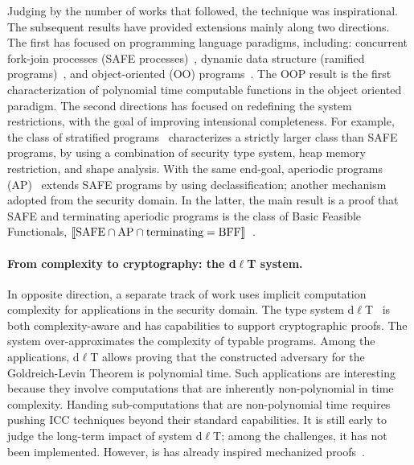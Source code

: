 Judging by the number of works that followed, the technique was inspirational.
The subsequent results have provided extensions mainly along two directions.
The first has focused on programming language paradigms, including: 
concurrent fork-join processes (SAFE processes)~\cite{hainry2013},
dynamic data structure (ramified programs)~\cite{leivant2013}, and
{object-oriented (OO) programs}~\cite{hainry2015}.
The OOP result is the first characterization of polynomial time computable functions in the object oriented paradigm.
The second directions has focused on redefining the system restrictions, with the goal of improving intensional completeness.
For example, the class of stratified programs~\cite{hainry2023} characterizes a strictly larger class than SAFE programs,
by using a combination of {security type system}, heap memory restriction, and shape analysis.
With the same end-goal, aperiodic programs (AP)~\cite{hainry2024} extends SAFE programs by using declassification;
another mechanism adopted from the security domain.
In the latter, the main result is a proof that SAFE and terminating aperiodic programs is the class of Basic Feasible Functionals, \ie \(\llbracket\text{SAFE} \cap \text{AP} \cap \text{terminating} = \text{BFF}\rrbracket\)~\cite{hainry2020,hainry2024}.

\paragraph*{From complexity to cryptography: the d\(\ell\)T system.}
In opposite direction, a separate track of work uses implicit computation complexity for applications in the security domain.
The type system d\(\ell\)T~\cite{baillot2015,baillot2019} is both complexity-aware and has capabilities to support cryptographic proofs.
The system over-approximates the complexity of typable programs.
Among the applications, d\(\ell\)T allows proving that the constructed adversary for 
the Goldreich-Levin Theorem is polynomial time.
Such applications are interesting because they involve computations that are inherently non-polynomial in time complexity.
Handing sub-computations that are non-polynomial time requires pushing ICC techniques beyond their standard capabilities.
It is still early to judge the long-term impact of system d\(\ell\)T\@;
among the challenges, it has not been implemented.
However, is has already inspired mechanized proofs~\cite{barbosa2021,feree2018}.

